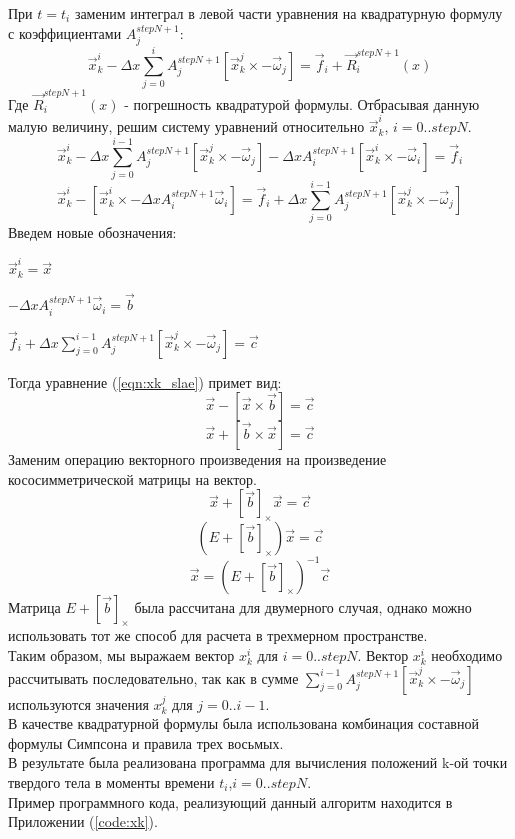 \documentclass[12pt,a4paper]{article}
\begin{document}
При $t=t_i$ заменим интеграл в левой части уравнения на квадратурную формулу с коэффициентами $A_j^{stepN+1}$:
\[
\overrightarrow{x}_k^i-\Delta x \sum_{j=0}^iA_j^{stepN+1}[\overrightarrow{x}_k^j\times-\overrightarrow{\omega}_j]=\overrightarrow{f}_i+\overrightarrow{R}_i^{stepN+1}(x)
\]
Где $\overrightarrow{R}_i^{stepN+1}(x)$ - погрешность квадратурой формулы. Отбрасывая данную малую величину, решим систему уравнений относительно $\overrightarrow{x}_k^i$, $i=0..stepN$.
\[
\overrightarrow{x}_k^i-\Delta x \sum_{j=0}^{i-1}A_j^{stepN+1}[\overrightarrow{x}_k^j\times-\overrightarrow{\omega}_j]-\Delta x A_i^{stepN+1}[\overrightarrow{x}_k^i\times-\overrightarrow{\omega}_i]=\overrightarrow{f}_i
\]
\begin{equation}
\label{eqn:xk_slae}
\overrightarrow{x}_k^i-[\overrightarrow{x}_k^i\times-\Delta x A_i^{stepN+1}\overrightarrow{\omega}_i]=\overrightarrow{f}_i+\Delta x \sum_{j=0}^{i-1}A_j^{stepN+1}[\overrightarrow{x}_k^j\times-\overrightarrow{\omega}_j]
\end{equation}
Введем новые обозначения:
\begin{list}{}{}
\item $\overrightarrow{x}_k^i=\overrightarrow{x}$
\item $-\Delta x A_i^{stepN+1}\overrightarrow{\omega}_i=\overrightarrow{b}$
\item $\overrightarrow{f}_i+\Delta x \sum_{j=0}^{i-1}A_j^{stepN+1}[\overrightarrow{x}_k^j\times-\overrightarrow{\omega}_j]=\overrightarrow{c}$
\end{list}
Тогда уравнение (\ref{eqn:xk_slae}) примет вид:
\[
\overrightarrow{x}-[\overrightarrow{x}\times\overrightarrow{b}]=\overrightarrow{c}
\]
\[
\overrightarrow{x}+[\overrightarrow{b}\times\overrightarrow{x}]=\overrightarrow{c}
\]
Заменим операцию векторного произведения на произведение кососимметрической матрицы на вектор.
\[
\overrightarrow{x}+[\overrightarrow{b}]_{\times}\overrightarrow{x}=\overrightarrow{c}
\]
\[
(E+[\overrightarrow{b}]_{\times})\overrightarrow{x}=\overrightarrow{c}
\]
\[
\overrightarrow{x}=(E+[\overrightarrow{b}]_{\times})^{-1}\overrightarrow{c}
\]
Матрица $E+[\overrightarrow{b}]_{\times}$ была рассчитана для двумерного случая, однако можно использовать тот же способ для расчета в трехмерном пространстве.\\
Таким образом, мы выражаем вектор $x_k^i$ для $i=0..stepN$. Вектор $x_k^i$ необходимо рассчитывать последовательно, так как в сумме $\sum_{j=0}^{i-1}A_j^{stepN+1}[\overrightarrow{x}_k^j\times-\overrightarrow{\omega}_j]$ используются значения $x_k^j$ для $j=0..i-1$.\\
В качестве квадратурной формулы была использована комбинация составной формулы Симпсона и правила трех восьмых.\\
В результате была реализована программа для вычисления положений k-ой точки твердого тела в моменты времени $t_i$,$i=0..stepN$.\\
Пример программного кода, реализующий данный алгоритм находится в Приложении (\ref{code:xk}).
\end{document}
